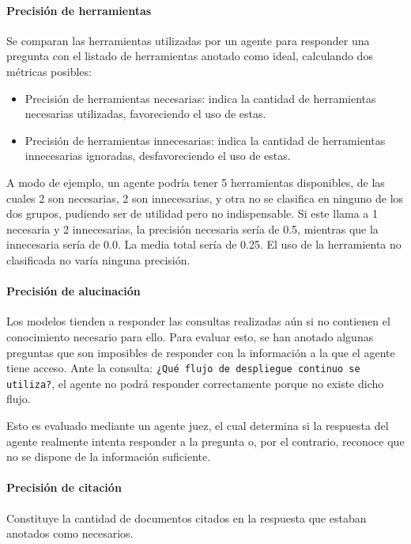\paragraph{Precisión de herramientas} Se comparan las herramientas utilizadas por un agente para responder una pregunta con el listado de herramientas anotado como ideal, calculando dos métricas posibles:

\begin{itemize}
\item Precisión de herramientas necesarias: indica la cantidad de herramientas necesarias utilizadas, favoreciendo el uso de estas.
\item Precisión de herramientas innecesarias: indica la cantidad de herramientas innecesarias ignoradas, desfavoreciendo el uso de estas.
\end{itemize}

A modo de ejemplo, un agente podría tener 5 herramientas disponibles, de las cuales 2 son necesarias, 2 son innecesarias, y otra no se clasifica en ninguno de los dos grupos, pudiendo ser de utilidad pero no indispensable. Si este llama a 1 necesaria y 2 innecesarias, la precisión necesaria sería de 0.5, mientras que la innecesaria sería de 0.0. La media total sería de 0.25. El uso de la herramienta no clasificada no varía ninguna precisión.

\paragraph{Precisión de alucinación} Los modelos tienden a responder las consultas realizadas aún si no contienen el conocimiento necesario para ello. Para evaluar esto, se han anotado algunas preguntas que son imposibles de responder con la información a la que el agente tiene acceso. Ante la consulta: \texttt{¿Qué flujo de despliegue continuo se utiliza?}, el agente no podrá responder correctamente porque no existe dicho flujo.

Esto es evaluado mediante un agente juez, el cual determina si la respuesta del agente realmente intenta responder a la pregunta o, por el contrario, reconoce que no se dispone de la información suficiente.

\paragraph{Precisión de citación} Constituye la cantidad de documentos citados en la respuesta que estaban anotados como necesarios.


